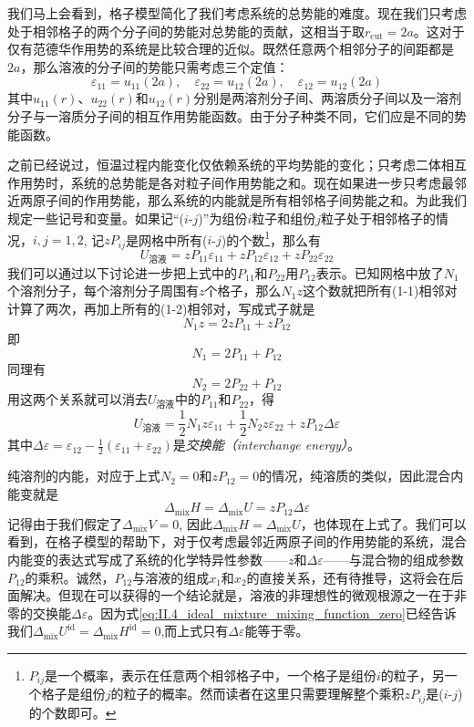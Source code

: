 \documentclass[main.tex]{subfiles}
\begin{document}
我们马上会看到，格子模型简化了我们考虑系统的总势能的难度。现在我们只考虑处于相邻格子的两个分子间的势能对总势能的贡献，这相当于取$r_\text{cut}=2a$。这对于仅有范德华作用势的系统是比较合理的近似。既然任意两个相邻分子的间距都是$2a$，那么溶液的分子间的势能只需考虑三个定值：
\[\varepsilon_{11}=u_{11}\left(2a\right),\quad\varepsilon_{22}=u_{12}\left(2a\right),\quad\varepsilon_{12}=u_{12}\left(2a\right)\]
其中$u_{11}\left(r\right)$、$u_{22}\left(r\right)$和$u_{12}\left(r\right)$分别是两溶剂分子间、两溶质分子间以及一溶剂分子与一溶质分子间的相互作用势能函数。由于分子种类不同，它们应是不同的势能函数。

之前已经说过，恒温过程内能变化仅依赖系统的平均势能的变化；只考虑二体相互作用势时，系统的总势能是各对粒子间作用势能之和。现在如果进一步只考虑最邻近两原子间的作用势能，那么系统的内能就是所有相邻格子间势能之和。为此我们规定一些记号和变量。如果记“($i$-$j$)”为组份$i$粒子和组份$j$粒子处于相邻格子的情况，$i,j=1,2$, 记$z P_{ij}$是网格中所有($i$-$j$)的个数\footnote{$P_{ij}$是一个概率，表示在任意两个相邻格子中，一个格子是组份$i$的粒子，另一个格子是组份$j$的粒子的概率。然而读者在这里只需要理解整个乘积$z P_{ij}$是($i$-$j$)的个数即可。}，那么有
\[U_\text{溶液}=zP_{11}\varepsilon_{11}+zP_{12}\varepsilon_{12}+zP_{22}\varepsilon_{22}\]
我们可以通过以下讨论进一步把上式中的$P_{11}$和$P_{22}$用$P_{12}$表示。已知网格中放了$N_1$个溶剂分子，每个溶剂分子周围有$z$个格子，那么$N_1 z$这个数就把所有(1-1)相邻对计算了两次，再加上所有的(1-2)相邻对，写成式子就是
\[N_1z=2zP_{11}+zP_{12}\]
即
\[N_1=2P_{11}+P_{12}\]
同理有
\[N_2=2P_{22}+P_{12}\]
用这两个关系就可以消去$U_\text{溶液}$中的$P_{11}$和$P_{22}$，得
\[
  U_\text{溶液}=\frac{1}{2}N_1z\varepsilon_{11}+\frac{1}{2}N_2z\varepsilon_{22}+zP_{12}\Delta\varepsilon
\]
其中$\Delta\varepsilon=\varepsilon_{12}-\frac{1}{2}\left(\varepsilon_{11}+\varepsilon_{22}\right)$是\emph{交换能（interchange energy）}。

纯溶剂的内能，对应于上式$N_2=0$和$zP_{12}=0$的情况，纯溶质的类似，因此混合内能变就是
\begin{equation}\label{eq:III.1_mixing_internal_energy_regular_solution}
  \Delta_\text{mix}H=\Delta_\text{mix}U=zP_{12}\Delta\varepsilon
\end{equation}
记得由于我们假定了$\Delta_\text{mix} V=0$, 因此$\Delta_\text{mix}H=\Delta_\text{mix}U$，也体现在上式了。我们可以看到，在格子模型的帮助下，对于仅考虑最邻近两原子间的作用势能的系统，混合内能变的表达式写成了系统的化学特异性参数——$z$和$\Delta\varepsilon$——与混合物的组成参数$P_{12}$的乘积。诚然，$P_{12}$与溶液的组成$x_1$和$x_2$的直接关系，还有待推导，这将会在后面解决。但现在可以获得的一个结论就是，溶液的非理想性的微观根源之一在于非零的交换能$\Delta\varepsilon$。因为式\eqref{eq:II.4_ideal_mixture_mixing_function_zero}已经告诉我们$\Delta_\text{mix}U^\text{id}=\Delta_\text{mix}H^\text{id}=0$,而上式只有$\Delta\varepsilon$能等于零。
\end{document}
